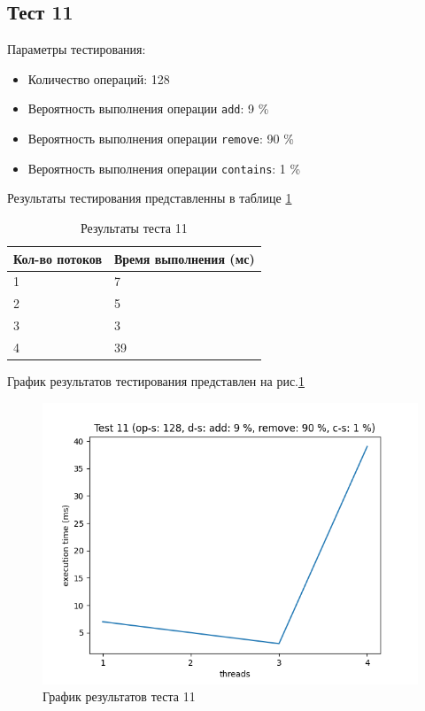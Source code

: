 \subsection*{Тест 11}

Параметры тестирования:

\begin{itemize}
    \item Количество операций: 128
    \item Вероятность выполнения операции \verb|add|: 9 \%
    \item Вероятность выполнения операции \verb|remove|: 90 \%
    \item Вероятность выполнения операции \verb|contains|: 1 \%
\end{itemize}

Результаты тестирования представленны в таблице \ref{tab:results11}


\begin{table}[H]
    \centering
    \begin{tabular}{|l|l|}
        \hline
        Кол-во потоков & Время выполнения (мс) \\
        \hline
        1 & 7 \\
        \hline
        2 & 5 \\
        \hline
        3 & 3 \\
        \hline
        4 & 39 \\
        \hline
    \end{tabular}
    \caption{Результаты теста 11}
    \label{tab:results11}
\end{table}
        

График результатов тестирования представлен на рис.\ref{fig:plot11}

\begin{figure}[H]
    \centering
    \includegraphics[width=0.7\linewidth]{photo/plot11}
    \caption{График результатов теста 11}
    \label{fig:plot11}
\end{figure}

